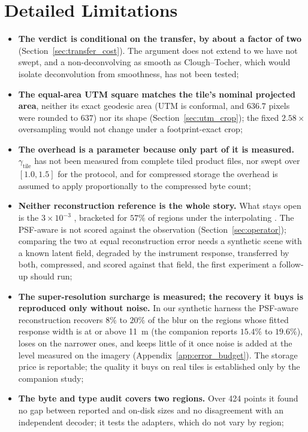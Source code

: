 \section{Detailed Limitations}
\label{app:limitations}
\begin{itemize}
    \item \textbf{The verdict is conditional on the transfer, by about a factor of two} (Section~\ref{sec:transfer_cost}). The argument does not extend to  we have not swept, and a non-deconvolving  as smooth as Clough--Tocher, which would isolate deconvolution from smoothness, has not been tested;
    \item \textbf{The equal-area UTM square matches the tile's nominal projected area}, neither its exact geodesic area (UTM is conformal, and $636.7$ pixels were rounded to $637$) nor its shape (Section~\ref{sec:utm_crop}); the fixed $2.58\times$ oversampling would not change under a footprint-exact crop;
    \item \textbf{The overhead is a parameter because only part of it is measured.}  $\gamma_{\mathrm{tile}}$ has not been measured from complete tiled product files, nor swept over $[1.0,1.5]$ for the  protocol, and for compressed storage the overhead is assumed to apply proportionally to the compressed byte count;
    \item \textbf{Neither reconstruction reference is the whole story.} What stays open is the $3\times10^{-3}$ , bracketed for $57\%$ of regions under the interpolating . The PSF-aware  is not scored against the observation (Section~\ref{sec:operator}); comparing the two  at equal reconstruction error needs a synthetic scene with a known latent field, degraded by the instrument response, transferred by both, compressed, and scored against that field, the first experiment a follow-up should run;
    \item \textbf{The super-resolution surcharge is measured; the recovery it buys is reproduced only without noise.} In our synthetic harness the PSF-aware reconstruction recovers $8\%$ to $20\%$ of the blur on the regions whose fitted response width is at or above \SI{11}{m} (the companion reports $15.4\%$ to $19.6\%$), loses on the narrower ones, and keeps little of it once noise is added at the level measured on the imagery (Appendix~\ref{app:error_budget}). The storage price is reportable; the quality it buys on real tiles is established only by the companion study;
    \item \textbf{The byte and type audit covers two regions.} Over 424 points it found no gap between reported and on-disk sizes and no disagreement with an independent decoder; it tests the adapters, which do not vary by region;

\end{itemize}
